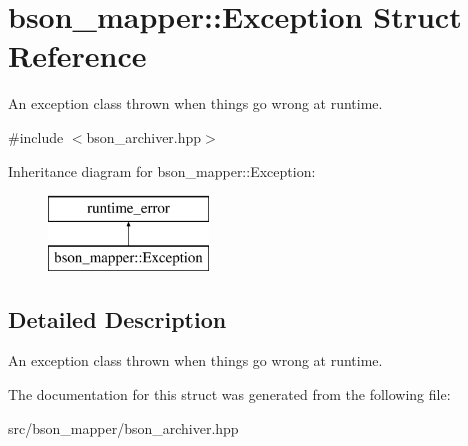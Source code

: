 \hypertarget{structbson__mapper_1_1Exception}{}\section{bson\+\_\+mapper\+:\+:Exception Struct Reference}
\label{structbson__mapper_1_1Exception}


An exception class thrown when things go wrong at runtime.  




{\ttfamily \#include $<$bson\+\_\+archiver.\+hpp$>$}

Inheritance diagram for bson\+\_\+mapper\+:\+:Exception\+:\begin{figure}[H]
\begin{center}
\leavevmode
\includegraphics[height=2.000000cm]{structbson__mapper_1_1Exception}
\end{center}
\end{figure}


\subsection{Detailed Description}
An exception class thrown when things go wrong at runtime. 

The documentation for this struct was generated from the following file\+:\begin{DoxyCompactItemize}
\item 
src/bson\+\_\+mapper/bson\+\_\+archiver.\+hpp\end{DoxyCompactItemize}
